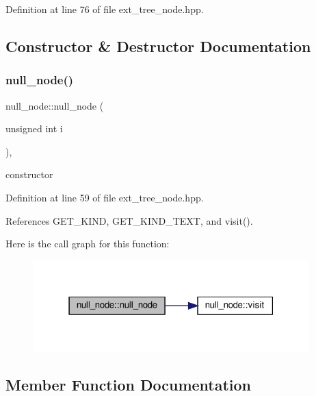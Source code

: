 Definition at line 76 of file ext\+\_\+tree\+\_\+node.\+hpp.



\subsection{Constructor \& Destructor Documentation}
\mbox{\label{structnull__node_a767e642f4b60c9d73145229e688d7177}} 
\subsubsection{\texorpdfstring{null\+\_\+node()}{null\_node()}}
{\footnotesize\ttfamily null\+\_\+node\+::null\+\_\+node (\begin{DoxyParamCaption}\item[{unsigned int}]{i }\end{DoxyParamCaption})\hspace{0.3cm}{\ttfamily [inline]}, {\ttfamily [explicit]}}



constructor 



Definition at line 59 of file ext\+\_\+tree\+\_\+node.\+hpp.



References G\+E\+T\+\_\+\+K\+I\+ND, G\+E\+T\+\_\+\+K\+I\+N\+D\+\_\+\+T\+E\+XT, and visit().

Here is the call graph for this function\+:
\nopagebreak
\begin{figure}[H]
\begin{center}
\leavevmode
\includegraphics[width=303pt]{dc/dae/structnull__node_a767e642f4b60c9d73145229e688d7177_cgraph}
\end{center}
\end{figure}


\subsection{Member Function Documentation}
\mbox{\label{structnull__node_a2ca249a9a55f750dad7443b376af929c}} 
